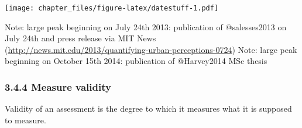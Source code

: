\documentclass[
]{article}
\newenvironment{Shaded}{\begin{snugshade}}{\end{snugshade}}
\newcommand{\DataTypeTok}[1]{\textcolor[rgb]{0.13,0.29,0.53}{#1}}
\newcommand{\DecValTok}[1]{\textcolor[rgb]{0.00,0.00,0.81}{#1}}
\newcommand{\FloatTok}[1]{\textcolor[rgb]{0.00,0.00,0.81}{#1}}
\newcommand{\KeywordTok}[1]{\textcolor[rgb]{0.13,0.29,0.53}{\textbf{#1}}}
\newcommand{\NormalTok}[1]{#1}
\newcommand{\OperatorTok}[1]{\textcolor[rgb]{0.81,0.36,0.00}{\textbf{#1}}}
\newcommand{\StringTok}[1]{\textcolor[rgb]{0.31,0.60,0.02}{#1}}
\begin{document}
\begin{Shaded}
\end{Shaded}

\texttt{[image: chapter\_files/figure-latex/datestuff-1.pdf]}

Note: large peak beginning on July 24th 2013: publication of
@salesses2013 on July 24th and press release via MIT News
(\url{http://news.mit.edu/2013/quantifying-urban-perceptions-0724})
Note: large peak beginning on October 15th 2014: publication of
@Harvey2014 MSc thesis

\hypertarget{measure-validity}{%
\subsubsection{3.4.4 Measure validity}\label{measure-validity}}

Validity of an assessment is the degree to which it measures what it is
supposed to measure.
\end{document}
